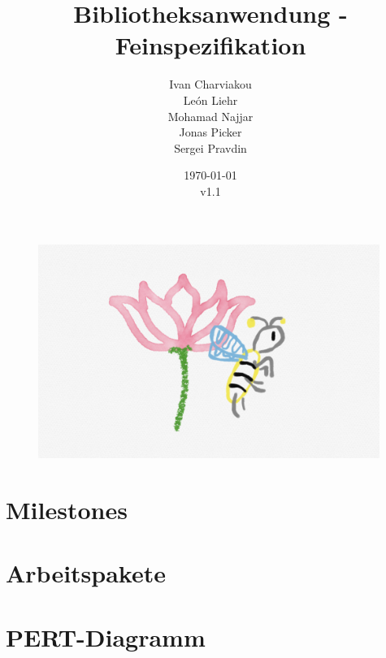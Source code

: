 \documentclass{article}
\title{Bibliotheksanwendung - Feinspezifikation}
\date{\today\\v1.1}
\author{
	Ivan Charviakou\\
	León Liehr\\
	Mohamad Najjar\\
	Jonas Picker\\
	Sergei Pravdin
}
\begin{document}
\maketitle
\begin{figure}[H]
	\centering
	\includegraphics[width = 30em]{Logo}
\end{figure}
\newpage
\tableofcontents
\newpage


\section{Milestones}


\section{Arbeitspakete}


\section{PERT-Diagramm}

\end{document}
